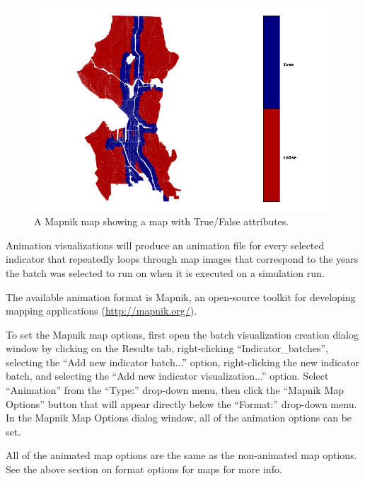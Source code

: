 \begin{figure}[hbp]
\begin{center}
\includegraphics[width=\textwidth]{part-gui/images/result-manager-TF-map.png}
\end{center}
\caption{A Mapnik map showing a map with True/False attributes.}
\label{fig:sample-map-TF-map}
\end{figure}
\clearpage


Animation visualizations will produce an animation file for every 
selected indicator that repeatedly loops through map images that 
correspond to the years the batch was selected to run on when 
it is executed on a simulation run.

The available animation format is Mapnik, an open-source toolkit for 
developing mapping applications (\url{http://mapnik.org/}).

To set the Mapnik map options, first open the batch visualization 
creation dialog window by clicking on the
Results tab, right-clicking ``Indicator_batches'', selecting the 
``Add new indicator batch...'' option, right-clicking the new 
indicator batch, and selecting the ``Add new
indicator visualization...'' option. Select ``Animation'' from the 
``Type:'' drop-down menu, then click the ``Mapnik Map
Options'' button that will appear directly below the ``Format:'' 
drop-down menu. In the Mapnik Map Options dialog
window, all of the animation options can be set.

All of the animated map options are the same as the 
non-animated map options. See the above section on format
options for maps for more info.

